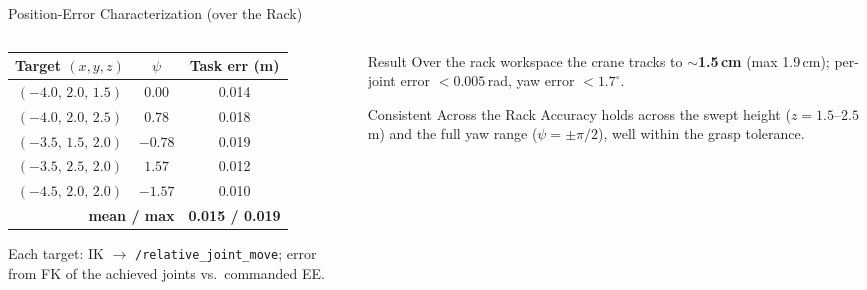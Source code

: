 \documentclass[aspectratio=169]{beamer}
\begin{document}
\begin{frame}{Position-Error Characterization (over the Rack)}
\vspace{-1mm}
\begin{columns}[c,totalwidth=\textwidth]
  \begin{column}{0.56\textwidth}
    \centering\footnotesize
    \begin{tabular}{ccc}
      \toprule
      \textbf{Target $(x,y,z)$} & \textbf{$\psi$} & \textbf{Task err (m)} \\
      \midrule
      $(-4.0,\,2.0,\,1.5)$ & $0.00$ & 0.014 \\
      $(-4.0,\,2.0,\,2.5)$ & $0.78$ & 0.018 \\
      $(-3.5,\,1.5,\,2.0)$ & $-0.78$ & 0.019 \\
      $(-3.5,\,2.5,\,2.0)$ & $1.57$ & 0.012 \\
      $(-4.5,\,2.0,\,2.0)$ & $-1.57$ & 0.010 \\
      \midrule
      \multicolumn{2}{r}{\textbf{mean / max}} & \textbf{0.015 / 0.019} \\
      \bottomrule
    \end{tabular}

    \vspace{2mm}
    {\scriptsize Each target: IK $\to$ \texttt{/relative\_joint\_move}; error from FK of the achieved joints vs.\ commanded EE.}
  \end{column}
  \begin{column}{0.42\textwidth}
    \begin{block}{Result}
      \footnotesize
      Over the rack workspace the crane tracks to \textbf{$\sim$1.5\,cm} (max 1.9\,cm); per-joint error $<0.005$\,rad, yaw error $<1.7^\circ$.
    \end{block}
    \vspace{-1mm}
    \begin{exampleblock}{Consistent Across the Rack}
      \footnotesize
      Accuracy holds across the swept height ($z = 1.5$--$2.5$\,m) and the full yaw range ($\psi = \pm\pi/2$), well within the grasp tolerance.
    \end{exampleblock}
  \end{column}
\end{columns}
\end{frame}
\end{document}
